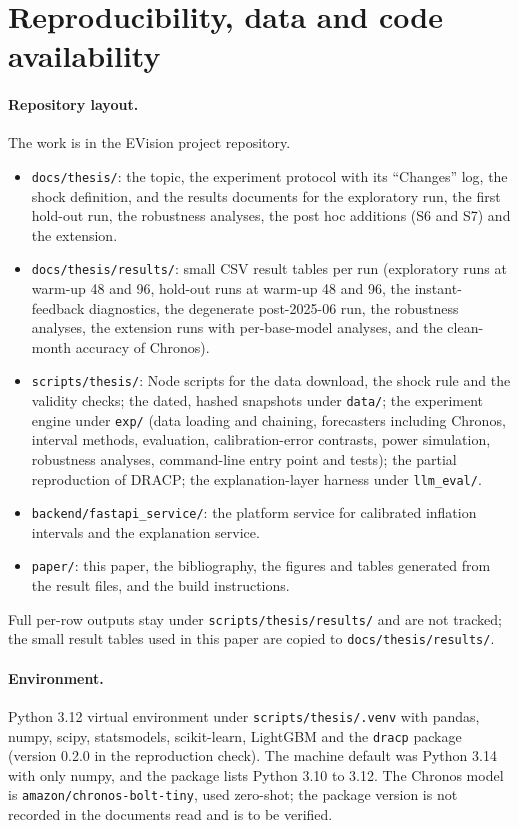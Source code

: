 \section{Reproducibility, data and code availability}\label{sec:repro}

\paragraph{Repository layout.} The work is in the EVision project repository.
\begin{itemize}
\item \texttt{docs/thesis/}: the topic, the experiment protocol with its ``Changes'' log, the shock definition, and the results documents for the exploratory run, the first hold-out run, the robustness analyses, the post hoc additions (S6 and S7) and the extension.
\item \texttt{docs/thesis/results/}: small CSV result tables per run (exploratory runs at warm-up 48 and 96, hold-out runs at warm-up 48 and 96, the instant-feedback diagnostics, the degenerate post-2025-06 run, the robustness analyses, the extension runs with per-base-model analyses, and the clean-month accuracy of Chronos).
\item \texttt{scripts/thesis/}: Node scripts for the data download, the shock rule and the validity checks; the dated, hashed snapshots under \texttt{data/}; the experiment engine under \texttt{exp/} (data loading and chaining, forecasters including Chronos, interval methods, evaluation, calibration-error contrasts, power simulation, robustness analyses, command-line entry point and tests); the partial reproduction of DRACP; the explanation-layer harness under \texttt{llm\_eval/}.
\item \texttt{backend/fastapi\_service/}: the platform service for calibrated inflation intervals and the explanation service.
\item \texttt{paper/}: this paper, the bibliography, the figures and tables generated from the result files, and the build instructions.
\end{itemize}
Full per-row outputs stay under \texttt{scripts/thesis/results/} and are not tracked; the small result tables used in this paper are copied to \texttt{docs/thesis/results/}.

\paragraph{Environment.} Python 3.12 virtual environment under \texttt{scripts/thesis/.venv} with pandas, numpy, scipy, statsmodels, scikit-learn, LightGBM and the \texttt{dracp} package (version 0.2.0 in the reproduction check). The machine default was Python 3.14 with only numpy, and the package lists Python 3.10 to 3.12. The Chronos model is \texttt{amazon/chronos-bolt-tiny}, used zero-shot; the package version is not recorded in the documents read and is to be verified.

